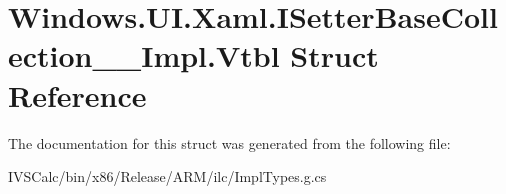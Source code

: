 \hypertarget{struct_windows_1_1_u_i_1_1_xaml_1_1_i_setter_base_collection_____impl_1_1_vtbl}{}\section{Windows.\+U\+I.\+Xaml.\+I\+Setter\+Base\+Collection\+\_\+\+\_\+\+Impl.\+Vtbl Struct Reference}
\label{struct_windows_1_1_u_i_1_1_xaml_1_1_i_setter_base_collection_____impl_1_1_vtbl}


The documentation for this struct was generated from the following file\+:\begin{DoxyCompactItemize}
\item 
I\+V\+S\+Calc/bin/x86/\+Release/\+A\+R\+M/ilc/Impl\+Types.\+g.\+cs\end{DoxyCompactItemize}
